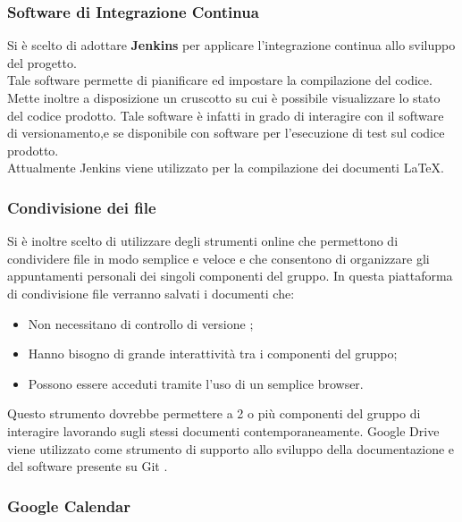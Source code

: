 \subsubsection{Software di Integrazione Continua}

Si \`{e} scelto di adottare \textbf{Jenkins} per applicare l’integrazione continua allo sviluppo del progetto.\\ 
Tale software permette di pianificare ed impostare la compilazione del codice.\\
Mette inoltre a disposizione un cruscotto su cui \`{e} possibile visualizzare lo stato del codice prodotto. Tale software \`{e} infatti in grado di interagire con il software di versionamento,e se disponibile con software per l’esecuzione di test sul codice prodotto.\\ 
Attualmente Jenkins viene utilizzato per la compilazione dei documenti \LaTeX. 


\subsubsection{Condivisione dei file}

  Si \`{e} inoltre scelto di utilizzare degli strumenti online che permettono di condividere file
  in modo semplice e veloce e che consentono di organizzare gli appuntamenti personali
  dei singoli componenti del gruppo.
  In questa piattaforma di condivisione file verranno salvati i documenti che:
  \begin{itemize}
  
  
  \item Non necessitano di controllo di versione ;
  \item Hanno bisogno di grande interattivit\`{a} tra i componenti del gruppo;
  \item Possono essere acceduti tramite l’uso di un semplice browser.
   \end{itemize}
  Questo strumento dovrebbe permettere a 2 o pi\`{u} componenti del gruppo di interagire
  lavorando sugli stessi documenti contemporaneamente. Google Drive viene utilizzato
  come strumento di supporto allo sviluppo della documentazione e del software presente
  su Git .
  


\subsubsection{Google Calendar}
 

